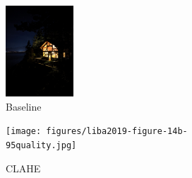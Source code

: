 \documentclass{sig-alternate}
\begin{document}
\begin{figure}
\centering
\begin{subfigure}{6pc}
\centering
\includegraphics[width=6pc]{figures/liba2019-figure-14a-95quality.jpg}
\caption{Baseline}
\label{fig:toneMapping:baseline}
\end{subfigure}
\begin{subfigure}{6pc}
\centering
\texttt{[image: figures/liba2019-figure-14b-95quality.jpg]}
\caption{CLAHE}
\label{fig:toneMapping:clahe}
\end{subfigure}
\begin{subfigure}{6pc}
\centering

\end{subfigure}
\end{figure}
\end{document}
